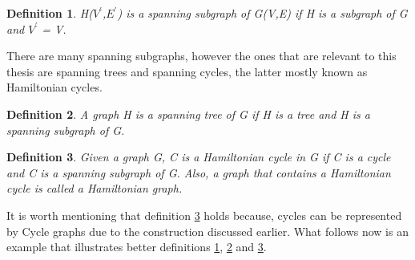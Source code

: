 \documentclass[12pt]{article}
\newtheorem{definition}{Definition}[subsection]
\numberwithin{equation}{subsection}
\numberwithin{table}{subsection}
\begin{document}
\begin{definition}
\label{spanning subgraph}
H($V^\prime$,$E^\prime$) is a spanning subgraph of G(V,E) if H is a subgraph of G and $V^\prime$ = V. 
\end{definition}
There are many spanning subgraphs, however the ones that are relevant to this thesis are spanning trees and spanning cycles, the latter mostly known as Hamiltonian cycles.
\begin{definition}
A graph H is a spanning tree of G if H is a tree and H is a spanning subgraph of G. 
\label{spanning tree}
\end{definition}
\begin{definition}
\label{hamiltonian cycle}
Given a graph G, C is a Hamiltonian cycle in G if C is a cycle and C is a spanning subgraph of G. Also, a graph that contains a Hamiltonian cycle is called a Hamiltonian graph. 
\end{definition}
It is worth mentioning that definition \ref{hamiltonian cycle} holds because, cycles can be represented by Cycle graphs due to the construction discussed earlier. What follows now is an example that illustrates better definitions \ref{spanning subgraph}, \ref{spanning tree} and \ref{hamiltonian cycle}. 
\end{document}
